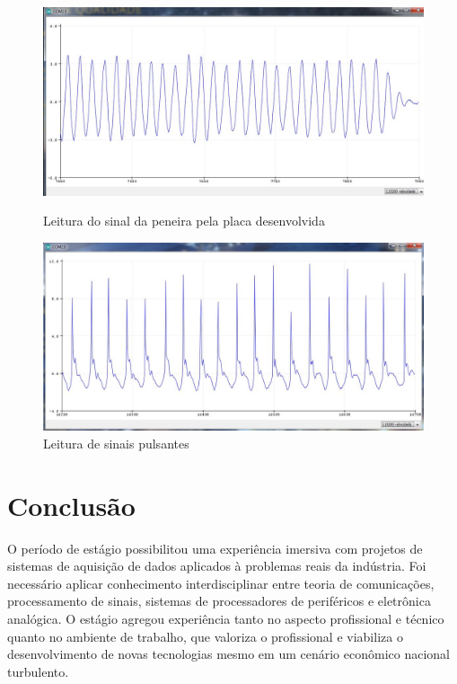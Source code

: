\documentclass[11pt]{abntex2}
\begin{document}
				\begin{figure}[!ht]
					\centering
					\begin{minipage}{0.4\linewidth}
						\centering
						\includegraphics[width = \linewidth]{../Fotos/sinal3g.jpg}
						\caption{Leitura do sinal da peneira pela placa desenvolvida}
					\end{minipage}
					\hfill\vline\hfill
					\begin{minipage}{0.4\linewidth}
						\centering
						\includegraphics[width = \linewidth]{../Fotos/pulsante.jpg}
						\caption{Leitura de sinais pulsantes}
					\end{minipage}
				\end{figure}

		\chapter{Conclusão}
			O período de estágio possibilitou uma experiência imersiva com
			projetos de sistemas de aquisição de dados aplicados à problemas
			reais da indústria. Foi necessário aplicar conhecimento
			interdisciplinar entre teoria de comunicações, processamento de
			sinais, sistemas de processadores de periféricos e eletrônica
			analógica. O estágio agregou experiência tanto no aspecto
			profissional e técnico quanto no ambiente de trabalho, que valoriza
			o profissional e viabiliza o desenvolvimento de novas tecnologias
			mesmo em um cenário econômico nacional turbulento.
\end{document}
